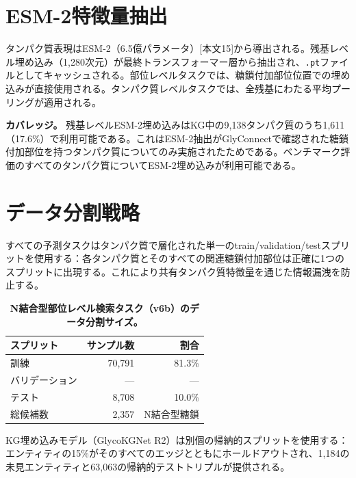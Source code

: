 \documentclass[11pt,a4paper]{ltjsarticle}
\begin{document}
\section{ESM-2特徴量抽出}
\label{sec:esm2}

タンパク質表現はESM-2（6.5億パラメータ）[本文15]から導出される。残基レベル埋め込み（1,280次元）が最終トランスフォーマー層から抽出され、\texttt{.pt}ファイルとしてキャッシュされる。部位レベルタスクでは、糖鎖付加部位位置での埋め込みが直接使用される。タンパク質レベルタスクでは、全残基にわたる平均プーリングが適用される。

\textbf{カバレッジ。}
残基レベルESM-2埋め込みはKG中の9,138タンパク質のうち1,611（17.6\%）で利用可能である。これはESM-2抽出がGlyConnectで確認された糖鎖付加部位を持つタンパク質についてのみ実施されたためである。ベンチマーク評価のすべてのタンパク質についてESM-2埋め込みが利用可能である。

\section{データ分割戦略}
\label{sec:splits}

すべての予測タスクはタンパク質で層化された単一のtrain/validation/testスプリットを使用する：各タンパク質とそのすべての関連糖鎖付加部位は正確に1つのスプリットに出現する。これにより共有タンパク質特徴量を通じた情報漏洩を防止する。

\begin{table}[H]
\centering
\caption{\textbf{N結合型部位レベル検索タスク（v6b）のデータ分割サイズ。}}
\label{tab:splits}
\small
\begin{tabular}{lrr}
\toprule
\textbf{スプリット} & \textbf{サンプル数} & \textbf{割合} \\
\midrule
訓練      & 70,791 & 81.3\% \\
バリデーション &  ---   & --- \\
テスト       &  8,708 & 10.0\% \\
\midrule
総候補数 & 2,357 & N結合型糖鎖 \\
\bottomrule
\end{tabular}
\end{table}

KG埋め込みモデル（GlycoKGNet R2）は別個の帰納的スプリットを使用する：エンティティの15\%がそのすべてのエッジとともにホールドアウトされ、1,184の未見エンティティと63,063の帰納的テストトリプルが提供される。
\end{document}
